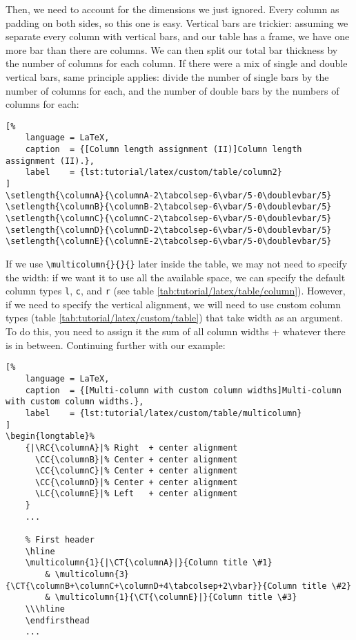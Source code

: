 Then, we need to account for the dimensions we just ignored. Every column as padding on both sides, so this one is easy. Vertical bars are trickier: assuming we separate every column with vertical bars, and our table has a frame, we have one more bar than there are columns. We can then split our total bar thickness by the number of columns for each column. If there were a mix of single and double vertical bars, same principle applies: divide the number of single bars by the number of columns for each, and the number of double bars by the numbers of columns for each:
\bigskip

\begin{lstlisting}[%
    language = LaTeX,
    caption  = {[Column length assignment (II)]Column length assignment (II).},
    label    = {lst:tutorial/latex/custom/table/column2}
]
\setlength{\columnA}{\columnA-2\tabcolsep-6\vbar/5-0\doublevbar/5}
\setlength{\columnB}{\columnB-2\tabcolsep-6\vbar/5-0\doublevbar/5}
\setlength{\columnC}{\columnC-2\tabcolsep-6\vbar/5-0\doublevbar/5}
\setlength{\columnD}{\columnD-2\tabcolsep-6\vbar/5-0\doublevbar/5}
\setlength{\columnE}{\columnE-2\tabcolsep-6\vbar/5-0\doublevbar/5}
\end{lstlisting}

If we use \texttt{\textbackslash{}multicolumn\{\}\{\}\{\}} later inside the table, we may not need to specify the width: if we want it to use all the available space, we can specify the default column types \texttt{l}, \texttt{c}, and \texttt{r} (see table \ref{tab:tutorial/latex/table/column}). However, if we need to specify the vertical alignment, we will need to use custom column types (table \ref{tab:tutorial/latex/custom/table}) that take width as an argument. To do this, you need to assign it the sum of all column widths + whatever there is in between. Continuing further with our example:
\bigskip

\begin{lstlisting}[%
    language = LaTeX,
    caption  = {[Multi-column with custom column widths]Multi-column with custom column widths.},
    label    = {lst:tutorial/latex/custom/table/multicolumn}
]
\begin{longtable}%
    {|\RC{\columnA}|% Right  + center alignment
      \CC{\columnB}|% Center + center alignment
      \CC{\columnC}|% Center + center alignment
      \CC{\columnD}|% Center + center alignment
      \LC{\columnE}|% Left   + center alignment
    }
    ...
    
    % First header
    \hline
    \multicolumn{1}{|\CT{\columnA}|}{Column title \#1}
        & \multicolumn{3}{\CT{\columnB+\columnC+\columnD+4\tabcolsep+2\vbar}}{Column title \#2}
        & \multicolumn{1}{\CT{\columnE}|}{Column title \#3}
    \\\hline
    \endfirsthead
    ...
\end{lstlisting}